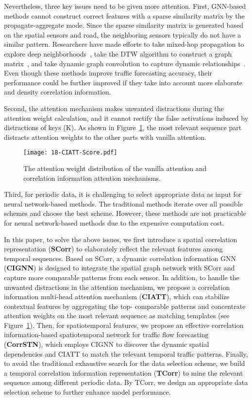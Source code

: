 \documentclass[sn-mathphys,iicol]{sn-jnl}
\newcommand\figref[1]{Figure~\ref{#1}}
\theoremstyle{thmstyleone}\newtheorem{theorem}{Theorem}\newtheorem{proposition}[theorem]{Proposition}
\theoremstyle{thmstyletwo}\newtheorem{example}{Example}\newtheorem{remark}{Remark}
\theoremstyle{thmstylethree}\newtheorem{definition}{Definition}
\begin{document}
Nevertheless, three key issues need to be given more attention. First, GNN-based methods cannot construct correct features with a sparse similarity matrix by the propagate-aggregate mode. Since the sparse similarity matrix is generated based on the spatial sensors and road, the neighboring sensors typically do not have a similar pattern. Researchers have made efforts to take mixed-hop propagation to explore deep neighborhoods~\cite{Wu:2020}, take the DTW algorithm to construct a graph matrix~\cite{Li_Zhu_2021,Fang:2021}, and take dynamic graph convolution to capture dynamic relationships~\cite{Zheng.2020,Han:2021}. Even though these methods improve traffic forecasting accuracy, their performance could be further improved if they take into account more elaborate and density correlation information.

Second, the attention mechanism makes unwanted distractions during the attention weight calculation, and it cannot rectify the false activations induced by distractions of keys (K). As shown in \figref{fig:CIATT-diff}, the most relevant sequence part distracts attention weights to the other parts with vanilla attention.

\begin{figure}[!h]
\centering
\texttt{[image: 18-CIATT-Score.pdf]}
\caption{The attention weight distribution of the vanilla attention and correlation information attention mechanisms.}
\label{fig:CIATT-diff}
\end{figure}

Third, for periodic data, it is challenging to select appropriate data as input for neural network-based methods. The traditional methods iterate over all possible schemes and choose the best scheme. However, these methods are not practicable for neural network-based methods due to the expensive computation cost.

In this paper, to solve the above issues, we first introduce a spatial correlation representation (\textbf{SCorr}) to elaborately reflect the relevant features among temporal sequences. Based on SCorr, a dynamic correlation information GNN (\textbf{CIGNN}) is designed to integrate the spatial graph network with SCorr and capture more comparable patterns from each sensor. In addition, to handle the unwanted distractions in the attention mechanism, we propose a correlation information multi-head attention mechanism (\textbf{CIATT}), which can stabilize contextual features by aggregating the top- comparable patterns and concentrate attention weights on the most relevant sequence as matching templates (see \figref{fig:CIATT-diff}). Then, for spatiotemporal features, we propose an effective correlation information-based spatiotemporal network for traffic flow forecasting (\textbf{CorrSTN}), which employs CIGNN to discover the dynamic spatial dependencies and CIATT to match the relevant temporal traffic patterns. Finally, to avoid the traditional exhaustive search for the data selection scheme, we build a temporal correlation information representation (\textbf{TCorr}) to mine the relevant sequence among different periodic data. By TCorr, we design an appropriate data selection scheme to further enhance model performance.
\end{document}
